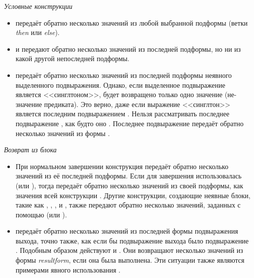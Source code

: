 \begin{flushdesc}
\item[\emph{Условные конструкции}]\leavevmode
\begin{itemize}

\item
{} передаёт обратно несколько значений из любой выбранной подформы (ветки
\emph{then} или \emph{else}).

\item
{} и  передают обратно несколько значений из последней подформы,
но ни из какой другой непоследней подформы.

\item
{} передаёт обратно несколько значений из последней подформы неявного
 выделенного подвыражения.
Однако, если выделенное подвыражение является <<синглтоном>>, будет возвращено
только одно значение (не-{\false} значение предиката).
Это верно, даже если выражение <<синглтон>> является последним подвыражением
.
Нельзя рассматривать последнее подвыражение , как будто оно . Последнее подвыражение передаёт обратно несколько значений из формы
.
\end{itemize}

\item[\emph{Возврат из блока}]\leavevmode
\begin{itemize}

\item
При нормальном завершении конструкция  передаёт обратно несколько значений из её последней
подформы. Если для завершения использовалась  (или
), тогда  передаёт обратно несколько значений из
своей подформы, как значения всей конструкции  . Другие конструкции,
создающие неявные блоки, такие как 
, , ,  и
, также передают обратно несколько значений, заданных с помощью 
 (или ).

\item
{} передаёт обратно несколько значений из последней формы подвыражения
выхода, точно также, как если бы подвыражение выхода было подвыражение
.
Подобным образом действуют  и . Они возвращают
несколько значений из формы \emph{resultform}, если она была выполнена.
Эти ситуации также являются примерами явного использования .
\end{itemize}


\end{flushdesc}

